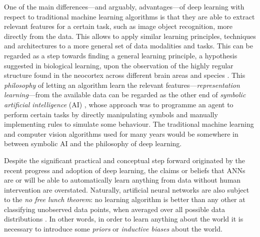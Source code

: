 {One of the main differences---and arguably, advantages---of deep learning with respect to traditional machine learning algorithms is that they are able to extract relevant features for a certain task, such as image object recognition, more directly from the data. This allows to apply similar learning principles, techniques and architectures to a more general set of data modalities and tasks. This can be regarded as a step towards finding a general learning principle, a hypothesis suggested in biological learning, upon the observation of the highly regular structure found in the neocortex across different brain areas and species \citep{douglas1989neocortex, harris2015neocortex}. This \textit{philosophy} of letting an algorithm learn the relevant features---\textit{representation learning}---from the available data can be regarded as the other end of \textit{symbolic artificial intelligence} (AI) \citep{haugeland1989ai}, whose approach was to programme an agent to perform certain tasks by directly manipulating symbols and manually implementing rules to simulate some behaviour. The traditional machine learning and computer vision algorithms used for many years would be somewhere in between symbolic AI and the philosophy of deep learning.

Despite the significant practical and conceptual step forward originated by the recent progress and adoption of deep learning, the claims or beliefs that ANNs are or will be able to automatically learn anything from data without human intervention are overstated. Naturally, artificial neural networks are also subject to the \textit{no free lunch theorem}: no learning algorithm is better than any other at classifying unobserved data points, when averaged over all possible data distributions \citep{wolpert1996nofreelunch}. In other words, in order to learn anything about the world it is necessary to introduce some \textit{priors} or \textit{inductive biases} about the world.

}
